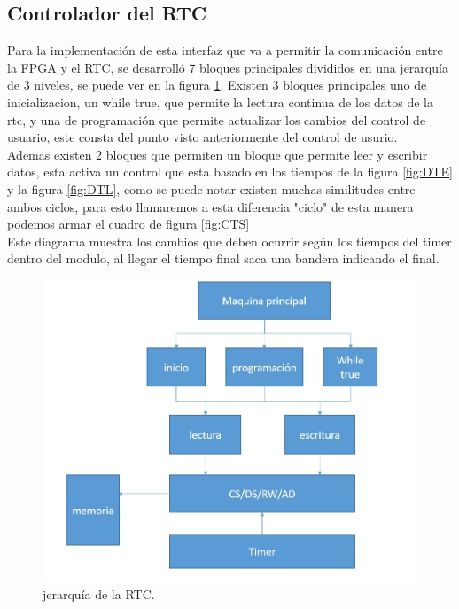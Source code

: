 \documentclass[12pt,a4paper]{article}
\begin{document}
		\subsection{Controlador del RTC}
		Para la implementación de esta interfaz que va a permitir la comunicación entre la FPGA y el RTC, se desarrolló 7 bloques principales divididos en una jerarquía de 3 niveles, se puede ver en la figura \ref{fig:Jrtc}. Existen 3 bloques principales uno de inicializacion, un while true, que permite la lectura continua de los datos de la rtc, y una de programación que permite actualizar los cambios del control de usuario, este consta del punto visto anteriormente del control de usurio.\\ [2ex]
		Ademas existen 2 bloques que permiten un bloque que permite leer y escribir datos, esta activa un control que esta basado en los tiempos de la figura \ref{fig:DTE} y la figura \ref{fig:DTL}, como se puede notar existen muchas similitudes entre ambos ciclos, para esto llamaremos a esta diferencia "ciclo" de esta manera podemos armar el cuadro de figura \ref{fig:CTS}\\[2ex]
		Este diagrama muestra los cambios que deben ocurrir según los tiempos del timer dentro del modulo, al llegar el tiempo final saca una bandera indicando el final.\\ [2ex]
		\begin{figure}[htbp]
			\centering
			\includegraphics[height=9cm, width=16cm]{img/JerarquiaRTC.jpg}
			\caption[3erNivel]{jerarquía de la RTC.}
			\label{fig:Jrtc}
		\end{figure}
\end{document}
